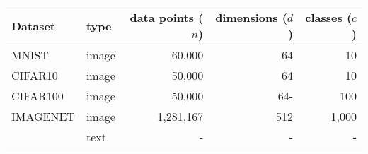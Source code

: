 \begin{tabular}{llrrr}
    \toprule
    Dataset  & type & data points ($n$) & dimensions ($d$) & classes ($c$) \\
    \midrule
    MNIST    & image & 60,000 & 64 & 10\\
    CIFAR10  & image & 50,000 & 64 & 10 \\
    CIFAR100 & image & 50,000 &64- & 100 \\
    IMAGENET & image & 1,281,167 & 512 & 1,000\\
     & text & - & - & - \\
    \bottomrule
\end{tabular}
\caption{
}

